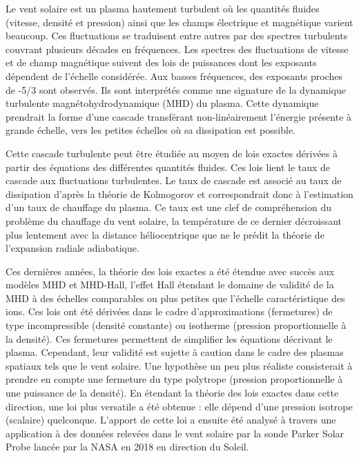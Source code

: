 	Le vent solaire est un plasma hautement turbulent où les quantités fluides (vitesse, densité et pression) ainsi que les champs électrique et magnétique varient beaucoup. Ces fluctuations se traduisent entre autres par des spectres turbulents couvrant plusieurs décades en fréquences. Les spectres des fluctuations de vitesse et de champ magnétique suivent des lois de puissances dont les exposants dépendent de l’échelle considérée. Aux basses fréquences, des exposants proches de -5/3 sont observés. Ils sont interprétés comme une signature de la dynamique turbulente magnétohydrodynamique (MHD) du plasma. Cette dynamique prendrait la forme d’une cascade transférant non-linéairement l’énergie présente à grande échelle, vers les petites échelles où sa dissipation est possible.
	
	Cette cascade turbulente peut être étudiée au moyen de lois exactes dérivées à partir des équations des différentes quantités fluides. Ces lois lient le taux de cascade aux fluctuations turbulentes. Le taux de cascade est associé au taux de dissipation d’après la théorie de Kolmogorov et correspondrait donc à l’estimation d’un taux de chauffage du plasma. Ce taux est une clef de compréhension du problème du chauffage du vent solaire, la température de ce dernier décroissant plus lentement avec la distance héliocentrique que ne le prédit la théorie de l’expansion radiale adiabatique.
	
	Ces dernières années, la théorie des lois exactes a été étendue avec succès aux modèles MHD et MHD-Hall, l’effet Hall étendant le domaine de validité de la MHD à des échelles comparables ou plus petites que l’échelle caractéristique des ions. Ces lois ont été dérivées dans le cadre d’approximations (fermetures) de type incompressible (densité constante) ou isotherme (pression proportionnelle à la densité). Ces fermetures permettent de simplifier les équations décrivant le plasma. Cependant, leur validité est sujette à caution dans le cadre des plasmas spatiaux tels que le vent solaire. Une hypothèse un peu plus réaliste consisterait à prendre en compte une fermeture du type polytrope (pression proportionnelle à une puissance de la densité).  En étendant la théorie des lois exactes dans cette direction, une loi plus versatile a été obtenue : elle dépend d’une pression isotrope (scalaire) quelconque.  L’apport de cette loi a ensuite été analysé à travers une application à des données relevées dans le vent solaire par la sonde Parker Solar Probe lancée par la NASA en 2018 en direction du Soleil.
	
